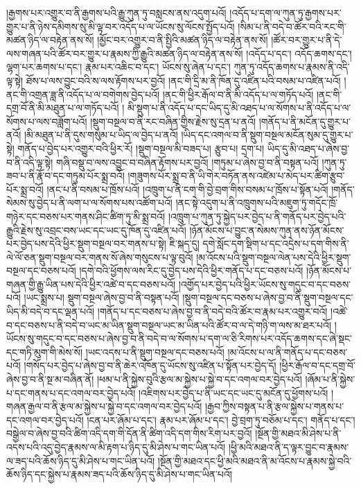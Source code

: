 །རྒྱགས་པར་འགྱུར་བ་ནི་རྒྱགས་པའི་རྒྱུ་ཀུན་ཏུ་བསླངས་ནས་འདུག་པའོ། །འདོད་པ་དག་ལ་ཀུན་ཏུ་རྒྱགས་པར་གྱུར་པ་ནི་ཉེས་དམིགས་སུ་མི་ལྟ་བར་འདོད་པ་ལ་ཡོངས་སུ་ལོངས་སྤྱོད་པའོ། །སིམ་པ་ནི་བདེ་བ་ཚོར་བའི་རང་གི་མཚན་ཉིད་ལ་བརྟེན་ནས་སོ། །མྱོང་བར་འགྱུར་བ་ནི་སྤྱིའི་མཚན་ཉིད་ལ་བརྟེན་ནས་སོ། །ཚོར་བར་གྱུར་པ་ནི་དེ་ལས་གཞན་པའི་ཚོར་བར་གྱུར་པ་རྣམས་ཀྱི་རྒྱུའི་མཚན་ཉིད་ལ་བརྟེན་ནས་སོ། །འདོད་པ་དང་། འདོད་ཆགས་དང་། ལྷག་པར་ཆགས་པ་དང་། རྣམ་པར་འཆིང་བ་དང་། ཡོངས་སུ་ཞེན་པ་དང་། ཀུན་ཏུ་འདོད་ཆགས་པ་རྣམས་ནི་འདི་ལྟ་སྟེ། ཐོས་པ་ལས་བྱུང་བའི་ས་ལས་རྟོགས་པར་བྱའོ། །ནང་གི་དྲི་མ་ནི་ཁོན་དུ་འཛིན་པའི་བསམ་པ་འཛིན་པའོ། །ནང་གི་འགྲན་ཟླ་ནི་འདོད་པ་ལ་བགེགས་བྱེད་པའོ། །ནང་གི་ཕྱིར་རྒོལ་བ་ནི་མི་འདོད་པ་ལ་གཏོད་པའོ། །ནང་གི་དགྲ་བོ་ནི་མི་མཐུན་པ་ལ་གཏོད་པའོ། །
མི་སྡུག་པ་ནི་འདོད་པ་དང་ཡིད་དུ་མི་འཐད་པ་ལ་སོགས་པ་ནི་འདོད་པ་ལ་སོགས་པ་ལས་བཟློག་པའོ། །སྡུག་བསྔལ་བ་ནི་རང་བཞིན་གྱིས་རྗེས་སུ་དྲན་པ་ནའོ། །གནོད་པ་ནི་མངོན་དུ་གྱུར་པ་ནའོ། །མི་མཐུན་པ་ནི་དུས་གསུམ་པ་ཡིད་ལ་བྱེད་པ་ནའོ། །ཡིད་དང་འགལ་བ་ནི་སྡུག་བསྔལ་མངོན་སུམ་དུ་གྱུར་པ་སྟེ། གནོད་པ་བྱེད་པར་འགྱུར་བའི་ཕྱིར་རོ། །སྡུག་བསྔལ་མི་བཟད་པ། རྩུབ་པ། དྲག་པ། ཡིད་དུ་མི་འཐད་པ་ཞེས་བྱ་བ་ནི་འདི་ལྟ་སྟེ། གཞི་བསྡུ་བ་ལས་འབྱུང་བ་བཞིན་རྟོགས་པར་བྱའོ། །གཏུམ་པ་ཞེས་བྱ་བ་ནི་བསྟན་པའོ། །ཀུན་ཏུ་ཟབ་པ་ནི་རྣོ་བ་དང་གཏུམ་པོར་སྨྲ་བའོ། །གཟུགས་པོར་སྨྲ་བ་ནི་ཡི་གེར་བཏོན་ནས་འཛེམ་པ་མེད་པར་ཚིག་རྩུབ་པོར་སྨྲ་བའོ། །ནང་པ་ནི་བསམ་པ་ཁྲོས་པའོ། །འཁྲུག་པ་ནི་ངག་གི་བྱེ་བྲག་གིས་བསམ་པ་ཁྲོས་པ་སྟོན་པའོ། །གནོད་སེམས་སུ་བྱེད་པ་ནི་ལག་པ་ལ་སོགས་པས་འཚོག་པའོ། །ནང་སྟེ་འདུག་པ་ནི་འཁྲུགས་པའི་མཇུག་ཏུ་གདོང་ཁྲོ་གཉེར་དང་བཅས་པར་གནས་ཤིང་ཚིག་ཏུ་མི་སྨྲ་བའོ། །འཁྲུག་པ་ཀུན་ཏུ་སྐྱེད་པར་བྱེད་པ་ནི་གནོད་པར་བྱེད་པའི་རྒྱུའི་རྗེས་སུ་འབྲང་བས་ཡང་དང་ཡང་དུ་ཁོན་དུ་འཛིན་པའོ། །ཉོན་མོངས་པ་བྱུང་ན་སེམས་ཀུན་ནས་ཉོན་མོངས་པར་བྱེད་པས་དེའི་ཕྱིར་སྡུག་བསྔལ་བར་གནས་པ་སྟེ། ཇི་སྐད་དུ། དགེ་སློང་དག་སྡིག་པ་དང་འདྲེས་པ་དག་གིས་ནི་ལེ་ལོ་ཅན་སྡུག་བསྔལ་བར་གནས་སོ་ཞེས་གསུངས་པ་ལྟ་བུའོ། །མ་འོངས་པའི་སྡུག་བསྔལ་ལེན་པས་དེའི་ཕྱིར་སྡུག་བསྔལ་དང་བཅས་པའོ། །དགེ་བའི་ཕྱོགས་ལས་རིང་དུ་བྱེད་པས་དེའི་ཕྱིར་གནོད་པ་དང་བཅས་པའོ། །ཉོན་མོངས་པ་གཞན་གྱི་རྒྱུ་ཡིན་པས་དེའི་ཕྱིར་འཚེ་བ་དང་བཅས་པའོ། །འགྱོད་པར་བྱེད་པའི་ཕྱིར་ཡོངས་སུ་གདུང་བ་དང་བཅས་པའོ། །ཡང་སྨྲས་པ། སྡུག་བསྔལ་ཞེས་བྱ་བ་ནི་བསྟན་པའོ། །སྡུག་བསྔལ་དང་བཅས་པ་ཞེས་བྱ་བ་ནི་སྡུག་བསྔལ་དང་ཡིད་མི་བདེ་བ་དང་ལྡན་པའོ། །གནོད་པ་དང་བཅས་པ་ཞེས་བྱ་བ་ནི་བདེ་བའི་ཚོར་བ་རྣམ་པར་འགྱུར་བའོ། །འཚེ་བ་དང་བཅས་པ་ནི་བདེ་བ་ཡང་མ་ཡིན་སྡུག་བསྔལ་ཡང་མ་ཡིན་པའི་ཚོར་བ་ལ་དེ་གཉི་ག་ལས་མ་ཐར་པའོ། །ཡོངས་སུ་གདུང་བ་དང་བཅས་པ་ཞེས་བྱ་བ་ནི་བདེ་བ་ལ་སོགས་པ་དག་ལ་ཅི་རིགས་པར་འདོད་ཆགས་དང་ཞེ་སྡང་དང་གཏི་མུག་གི་མེས་སོ། །ཡང་འདས་པ་ནི་སྡུག་བསྔལ་དང་བཅས་པའོ། །མ་འོངས་པ་ལ་ནི་གནོད་པ་དང་བཅས་པའོ། །གསོད་པར་བྱེད་པ་ཞེས་བྱ་བ་ནི་ཆེར་འཁོན་དུ་ཡོངས་སུ་འཛིན་པ་སྟོན་པར་བྱེད་དོ། །ཕྱིར་རྒོལ་བ་དང་དགྲ་བོ་ཞེས་བྱ་བ་ནི་སྔ་མ་བཞིན་ནོ། །ཕམ་པ་ནི་སྐྱེས་བུའི་རྩལ་མ་སྐྱེས་པ་སྐྱེ་བ་དང་འགལ་བར་བྱེད་པའོ། །ཞོམ་པ་ནི་སྐྱེས་པ་དང་གནས་པ་དང་འགལ་བར་བྱེད་པའོ། །འཇིགས་པར་བྱེད་པ་ནི་ཡང་དང་ཡང་དུ་མངོན་དུ་ཕྱོགས་པའོ། །གཞན་རྒྱལ་བ་ནི་རྩལ་མ་སྐྱེས་པ་སྐྱེ་བ་དང་འགལ་བར་བྱེད་པའོ། །རྒྱབ་ཀྱིས་བསྟན་པ་ནི་རྩལ་སྐྱེས་པ་གནས་པ་དང་འགལ་བར་བྱེད་པའོ། །ངན་པར་ཞོམ་པ་དང་། རྣམ་པར་ཞོམ་པ་དང་། བྱེ་བྲག་ཏུ་བཅོམ་པ་དང་། གནོད་པ་དང་། བསྒྱེལ་བ་ཞེས་བྱ་བའི་ཚིག་འདི་དག་གི་དོན་ནི་ཚིག་འདི་དག་གིས་རིག་པར་བྱའོ། །སྔོན་གྱི་མཐའ་མི་ཤེས་པ་ནི་འདས་པའི་འདུ་བྱེད་རྣམས་ལ་མི་རྟག་པ་ཉིད་དུ་མི་ཤེས་པ་གང་ཡིན་པའོ། །ཕྱི་མའི་མཐའ་ནི་ད་ལྟར་བྱུང་བ་རྣམས་ལ་ཟད་པའི་ཆོས་ཉིད་དུ་མི་ཤེས་པ་གང་ཡིན་པའོ། །སྔོན་གྱི་མཐའ་དང་ཕྱི་མའི་མཐའ་ནི་མ་འོངས་པ་རྣམས་སྐྱེ་བའི་ཆོས་ཉིད་དང་སྐྱེས་པ་རྣམས་ཟད་པའི་ཆོས་ཉིད་དུ་མི་ཤེས་པ་གང་ཡིན་པའོ། 